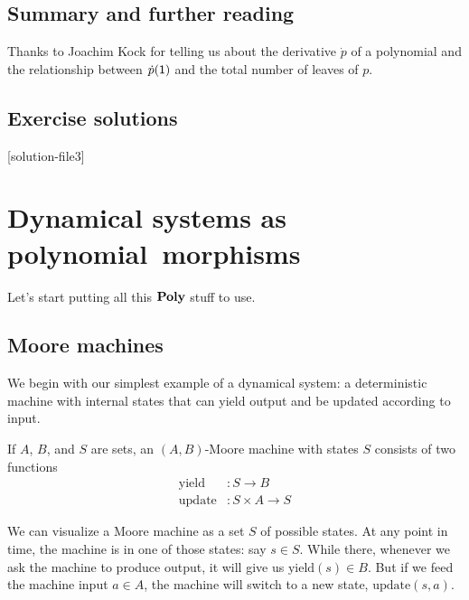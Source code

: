 \documentclass[Book-Poly]{subfiles}
\begin{document}
\section{Summary and further reading}

Thanks to Joachim Kock for telling us about the derivative $\dot{p}$ of a polynomial and the relationship between $\dot{p}(\textsf{1})$ and the total number of leaves of $p$.


\section{Exercise solutions}
{\footnotesize
}

[solution-file3]

\chapter{Dynamical systems as polynomial~morphisms} \label{ch.poly.dyn_sys}

Let's start putting all this $\mathbf{Poly}$ stuff to use. 

\section{Moore machines}

We begin with our simplest example of a dynamical system: a deterministic machine with internal states that can yield output and be updated according to input.

\begin{definition}\label{def.moore_machine}
If $A$, $B$, and $S$ are sets, an $(A,B)$-Moore machine with states $S$ consists of two functions
\begin{align*}
	\text{yield}&\colon S\to B\\
	\text{update}&\colon S\times A\to S 
\end{align*}
\end{definition}

We can visualize a Moore machine as a set $S$ of possible states.
At any point in time, the machine is in one of those states: say $s \in S$.
While there, whenever we ask the machine to produce output, it will give us $\text{yield}(s) \in B$.
But if we feed the machine input $a \in A$, the machine will switch to a new state, $\text{update}(s, a)$.
\end{document}
